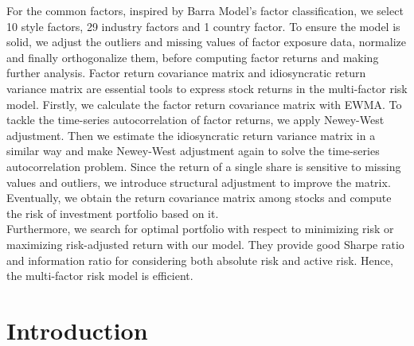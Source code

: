 \documentclass[10pt]{article}
\begin{document}
For the common factors, inspired by Barra Model's factor classification, we select 10 style factors, 29 industry factors and 1 country factor. To ensure the model is solid, we adjust the outliers and missing values of factor exposure data, normalize and finally orthogonalize them, before computing factor returns and making further analysis. 
Factor return covariance matrix and idiosyncratic return variance matrix are essential tools to express stock returns in the multi-factor risk model. Firstly, we calculate the factor return covariance matrix with EWMA. To tackle the time-series autocorrelation of factor returns, we apply Newey-West adjustment. Then we estimate the idiosyncratic return variance matrix in a similar way and make Newey-West adjustment again to solve the time-series autocorrelation problem. Since the return of a single share is sensitive to missing values and outliers, we introduce structural adjustment to improve the matrix.
Eventually, we obtain the return covariance matrix among stocks and compute the risk of investment portfolio based on it.\\

Furthermore, we search for optimal portfolio with respect to minimizing risk or maximizing risk-adjusted return with our model. They provide good Sharpe ratio and information ratio for considering both absolute risk and active risk. Hence, the multi-factor risk model is efficient.





\newpage
\tableofcontents


\newpage
\section{Introduction}
\end{document}
